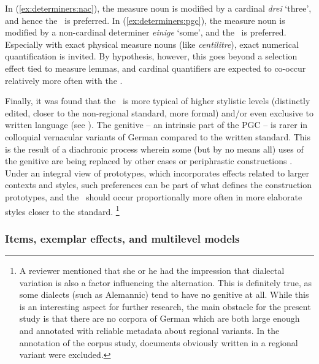 In (\ref{ex:determiners:nac}), the measure noun is modified by a cardinal \textit{drei} `three', and hence the \NACa\ is preferred.
In (\ref{ex:determiners:pgc}), the measure noun is modified by a non-cardinal determiner \textit{einige} `some', and the \PGCa\ is preferred.
Especially with exact physical measure nouns (like \textit{centilitre}), exact numerical quantification is invited.
By hypothesis, however, this goes beyond a selection effect tied to measure lemmas, and cardinal quantifiers are expected to co-occur relatively more often with the \NACa.

Finally, it was found that the \PGCa\ is more typical of higher stylistic levels (distinctly edited, closer to the non-regional standard, more formal) and\slash or even exclusive to written language (see \citealp[320--323]{Hentschel1993}).
The genitive -- an intrinsic part of the PGC -- is rarer in colloquial vernacular variants of German compared to the written standard.
This is the result of a diachronic process wherein some (but by no means all) uses of the genitive are being replaced by other cases or periphrastic constructions \citep{FleischerSchallert2011}.
Under an integral view of prototypes, which incorporates effects related to larger contexts and styles, such preferences can be part of what defines the construction prototypes, and the \PGCa\ should occur proportionally more often in more elaborate styles closer to the standard.%
\footnote{A reviewer mentioned that she or he had the impression that dialectal variation is also a factor influencing the alternation.
This is definitely true, as some dialects (such as Alemannic) tend to have no genitive at all.
While this is an interesting aspect for further research, the main obstacle for the present study is that there are no corpora of German which are both large enough and annotated with reliable metadata about regional variants.
In the annotation of the corpus study, documents obviously written in a regional variant were excluded.}

\subsubsection{Items, exemplar effects, and multilevel models}
\label{sec:itemandexemplareffects}

